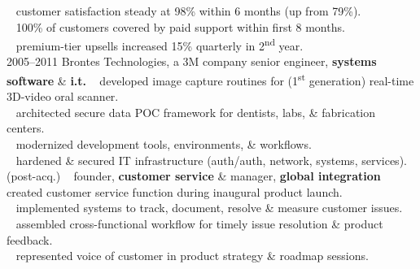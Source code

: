 \documentclass[]{friggeri-cv} %
\begin{document}
\begin{entrylist}
{{\tiny {}} ~ customer satisfaction steady at 98\% within 6 months (up from 79\%).\\
{\tiny {}} ~ 100\% of customers covered by paid support within first 8 months.\\
{\tiny {}} ~ premium-tier upsells increased 15\% quarterly in 2\textsuperscript{nd} year.\\}
\entry
{2005--2011}
{Brontes Technologies, a 3M company}
{senior engineer, {\textbf{\color{DarkGray}systems software} \& {\textbf{\color{DarkGray}i.t.}}}}
{{\tiny {}} ~ developed image capture routines for (1\textsuperscript{st} generation) real-time 3D-video oral scanner.\\
{\tiny {}} ~ architected secure data POC framework for dentists, labs, \& fabrication centers.\\
{\tiny {}} ~ modernized development tools, environments, \& workflows.\\
{\tiny {}} ~ hardened \& secured IT infrastructure (auth/auth, network, systems, services).}
\entry
{(post-acq.)}
{~}
{founder, \textbf{\color{DarkGray}customer service} \& manager, \textbf{\color{DarkGray}global integration}}
{{\tiny {}} ~ created customer service function during inaugural product launch.\\
{\tiny {}} ~ implemented systems to track, document, resolve \& measure customer issues.\\
{\tiny {}} ~ assembled cross-functional workflow for timely issue resolution \& product feedback.\\
{\tiny {}} ~ represented voice of customer in product strategy \& roadmap sessions.\\

}
\end{entrylist}
\end{document}
